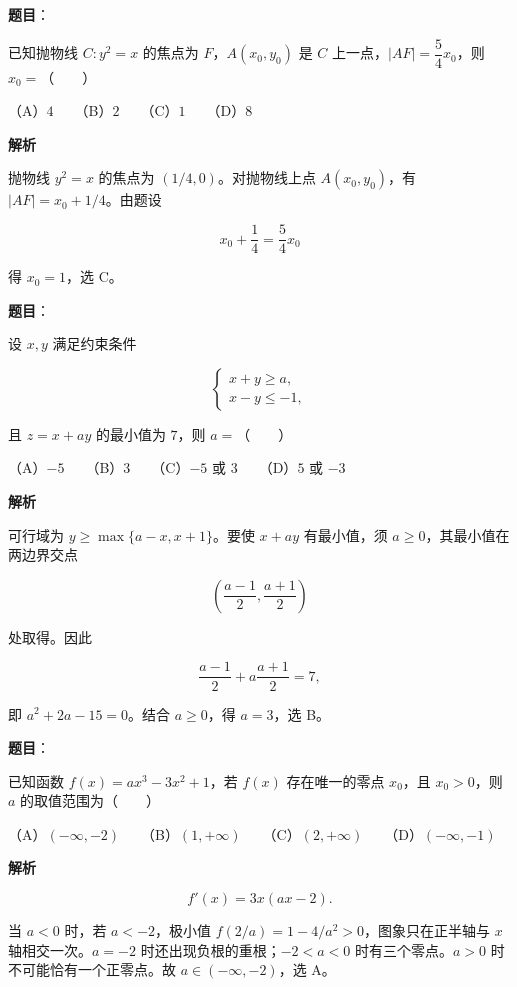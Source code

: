 \begin{answer}

\textbf{题目}：

已知抛物线 $C:y^2=x$ 的焦点为 $F$，$A(x_0,y_0)$ 是 $C$ 上一点，$|AF|=\dfrac54x_0$，则 $x_0=$\mbox{（　　）}

（A）$4$　　（B）$2$　　（C）$1$　　（D）$8$

\textbf{解析}

抛物线 $y^2=x$ 的焦点为 $(1/4,0)$。对抛物线上点 $A(x_0,y_0)$，有 $|AF|=x_0+1/4$。由题设

\nopagebreak[4]
\[
x_0+\frac14=\frac54x_0
\]

得 $x_0=1$，选 C。


\end{answer}
\begin{answer}

\textbf{题目}：

设 $x,y$ 满足约束条件

\nopagebreak[4]
\[
\begin{cases}
x+y\geqslant a,\\
x-y\leqslant-1,
\end{cases}
\]

且 $z=x+ay$ 的最小值为 $7$，则 $a=$\mbox{（　　）}

（A）$-5$　　（B）$3$　　（C）$-5$ 或 $3$　　（D）$5$ 或 $-3$

\textbf{解析}

可行域为 $y\geqslant\max\{a-x,x+1\}$。要使 $x+ay$ 有最小值，须 $a\geqslant0$，其最小值在两边界交点

\nopagebreak[4]
\[
\left(\frac{a-1}{2},\frac{a+1}{2}\right)
\]

处取得。因此

\nopagebreak[4]
\[
\frac{a-1}{2}+a\frac{a+1}{2}=7,
\]

即 $a^2+2a-15=0$。结合 $a\geqslant0$，得 $a=3$，选 B。


\end{answer}
\begin{answer}

\textbf{题目}：

已知函数 $f(x)=ax^3-3x^2+1$，若 $f(x)$ 存在唯一的零点 $x_0$，且 $x_0>0$，则 $a$ 的取值范围为\mbox{（　　）}

（A）$(-\infty,-2)$　　（B）$(1,+\infty)$　　（C）$(2,+\infty)$　　（D）$(-\infty,-1)$

\textbf{解析}

\nopagebreak[4]
\[
f'(x)=3x(ax-2).
\]

当 $a<0$ 时，若 $a<-2$，极小值 $f(2/a)=1-4/a^2>0$，图象只在正半轴与 $x$ 轴相交一次。$a=-2$ 时还出现负根的重根；$-2<a<0$ 时有三个零点。$a>0$ 时不可能恰有一个正零点。故 $a\in(-\infty,-2)$，选 A。


\end{answer}

